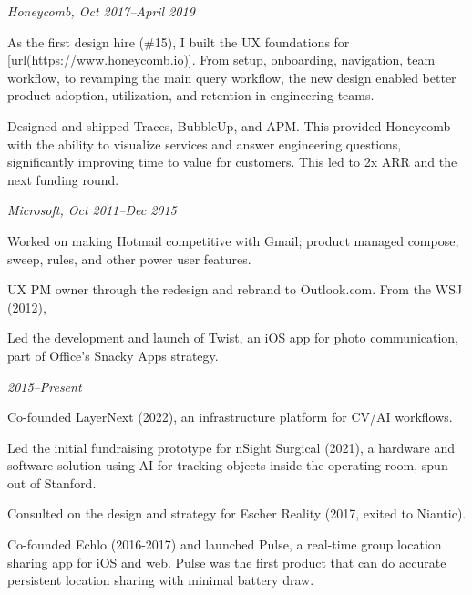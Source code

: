 \stopsectionlevel

\startsectionlevel[title={Product Design
Lead},reference={product-design-lead}]

{\em Honeycomb, Oct 2017--April 2019}

\startitemize[packed]
\item
  As the first design hire (\#15), I built the UX foundations for
  [url(https://www.honeycomb.io)]. From setup,
  onboarding, navigation, team workflow, to revamping the main query
  workflow, the new design enabled better product adoption, utilization,
  and retention in engineering teams.
\item
  Designed and shipped Traces, BubbleUp, and APM. This provided
  Honeycomb with the ability to visualize services and answer
  engineering questions, significantly improving time to value for
  customers. This led to 2x ARR and the next funding round.
\stopitemize

\stopsectionlevel

\startsectionlevel[title={Senior PM (Product &
UX)},reference={senior-pm-product-ux}]

{\em Microsoft, Oct 2011--Dec 2015}

\startitemize[packed]
\item
  Worked on making Hotmail competitive with Gmail; product managed
  compose, sweep, rules, and other power user features.
\item
  UX PM owner through the redesign and rebrand to Outlook.com. From the
  WSJ (2012), {\em {}}
\item
  Led the development and launch of Twist, an iOS app for photo
  communication, part of Office's Snacky Apps strategy.
\stopitemize

\stopsectionlevel

\startsectionlevel[title={Startups and
Contracts},reference={startups-and-contracts}]

{\em 2015--Present}

\startitemize[packed]
\item
  Co-founded LayerNext (2022), an infrastructure platform for CV/AI
  workflows.
\item
  Led the initial fundraising prototype for nSight Surgical (2021), a
  hardware and software solution using AI for tracking objects inside
  the operating room, spun out of Stanford.
\item
  Consulted on the design and strategy for Escher Reality (2017, exited
  to Niantic).
\item
  Co-founded Echlo (2016-2017) and launched Pulse, a real-time group
  location sharing app for iOS and web. Pulse was the first product that
  can do accurate persistent location sharing with minimal battery draw.
\stopitemize

